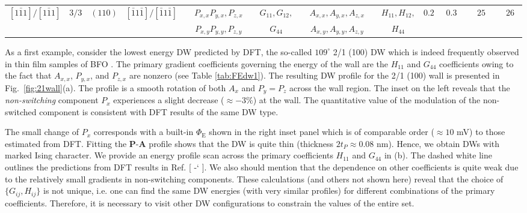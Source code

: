 \documentclass[%
 reprint,
superscriptaddress,
 amsmath,amssymb,
prb,
]{revtex4-1}
\newcommand*{\citen}[1]{%
  \begingroup
    \romannumeral-`\x %
    \setcitestyle{numbers}%
    \cite{#1}%
  \endgroup   
}
\begin{document}
\begin{table*}
\begin{tabular*}{\textwidth}{c|cc|c|cccccccc|cc|cccc}
$[1\bar{1}1]/[1\bar{1}1]$ & $3/3$ & $(110)$ & $[\bar{1}1\bar{1}]/[\bar{1}1\bar{1}]$ & & $P_{x,x} P_{y,x}, P_{z,x}$ & & $G_{11}, G_{12},$ & &  $A_{x,x}, A_{y,x}, A_{z,x}$ & & $H_{11}, H_{12},$ & $0.22$& $0.33$ & & $255$ & & $263$ \\
 &  & & & & $P_{x,y} P_{y,y}, P_{z,y}$ & & $G_{44}$ & & $A_{x,y}, A_{y,y}, A_{z,y}$ & & $H_{44}$ & & &  \\
\hline\hline
\end{tabular*}
\end{table*}

%
As a first example, consider the lowest energy DW predicted by DFT, the so-called $109^\circ$ 2/1 (100) DW which is indeed frequently observed in thin film samples of BFO \cite{Zhang2018, Parsonet2022}. %
%
The primary gradient coefficients governing the energy of the wall are the $H_{11}$ and $G_{44}$ coefficients owing to the fact that $A_{x,x}$, $P_{y,x}$, and $P_{z,x}$ are nonzero (see Table \ref{tab:FEdw1}). 
%
The resulting DW profile for the 2/1 (100) wall is presented in Fig.~\ref{fig:21wall}(a).
%
The profile is a smooth rotation of both $A_x$ and $P_y = P_z$ across the wall region.
%
The inset on the left reveals that the \emph{non-switching} component $P_x$ experiences a slight decrease ($\approx -3\%$) at the wall.
%
The quantitative value of the modulation of the non-switched component is consistent with DFT results of the same DW type\cite{Korbel2020}.
%


%
The small change of $P_x$ corresponds with a built-in $\Phi_\mathrm{E}$ shown in the right inset panel which is of comparable order ($\approx 10$ mV) to those estimated from DFT\cite{Korbel2020}.
%
Fitting the $\mathbf{P}$-$\mathbf{A}$ profile shows that the DW is quite thin (thickness $2 t_P \approx 0.08$ nm). Hence, we obtain DWs with marked Ising character.
%
We provide an energy profile scan across the primary coefficients $H_{11}$ and $G_{44}$ in (b).
%
The dashed white line outlines the predictions from DFT results in Ref. [\citen{Dieguez2013}].
%
We also should mention that the dependence on other coefficients is quite weak due to the relatively small gradients in non-switching components.
%
These calculations (and others not shown here) reveal that the choice of $\{G_{ij},H_{ij}\}$ is not unique, i.e. one can find the same DW energies (with very similar profiles) for different combinations of the primary coefficients.
%
Therefore, it is necessary to visit other DW configurations to constrain the values of the entire set.
%
\end{document}
